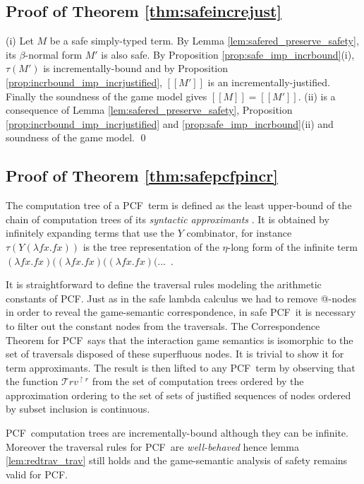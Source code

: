 \documentclass{llncs}
\newcommand\travset{\mathcal{T}rv}
\newcommand{\sem}[1]{{[\![ #1 ]\!]}}
\newcommand\pcf{\textsf{PCF}}
\begin{document}
\subsection{Proof of Theorem \ref{thm:safeincrejust}}
(i) Let $M$ be a safe simply-typed term. By Lemma
\ref{lem:safered_preserve_safety}, its $\beta$-normal form $M'$ is
also safe. By Proposition \ref{prop:safe_imp_incrbound}(i), $\tau(M')$
is incrementally-bound and by Proposition
\ref{prop:incrbound_imp_incrjustified}, $\sem{M'}$ is an
incrementally-justified. Finally the soundness of the game model gives
$\sem{M} = \sem{M'}$.  (ii) is a consequence of Lemma
\ref{lem:safered_preserve_safety}, Proposition
\ref{prop:incrbound_imp_incrjustified} and
\ref{prop:safe_imp_incrbound}(ii) and soundness of the game model.
\qed

\subsection{Proof of Theorem \ref{thm:safepcfpincr}}

The computation tree of a \pcf\ term is defined as the least
upper-bound of the chain of computation trees of its \emph{syntactic
  approximants} \cite{abramsky:game-semantics-tutorial}.  It is
obtained by infinitely expanding terms that use the $Y$ combinator,
for instance $\tau(Y (\lambda f x. f x))$ is the tree representation
of the $\eta$-long form of the infinite term $(\lambda f x. f x)
((\lambda f x. f x) ((\lambda f x. f x) ( \ldots$\ .


It is straightforward to define the traversal rules modeling the
arithmetic constants of \pcf. Just as in the safe lambda calculus
we had to remove @-nodes in order to reveal the game-semantic
correspondence, in safe \pcf\ it is necessary to filter out the
constant nodes from the traversals. The Correspondence Theorem for
\pcf\ says that the interaction game semantics is isomorphic to the
set of traversals disposed of these superfluous nodes. It is
trivial to show it for term approximants. The result is then
lifted to any \pcf\ term by observing that the function
$\travset^{\upharpoonright r}$ from the set of computation trees ordered by the approximation ordering to the set of sets of justified sequences of nodes ordered by subset inclusion is continuous.

\pcf\ computation trees are incrementally-bound although they can be infinite.
Moreover the traversal rules for \pcf\ are \emph{well-behaved} hence
lemma \ref{lem:redtrav_trav} still holds and the game-semantic
analysis of safety remains valid for \pcf.
\end{document}
